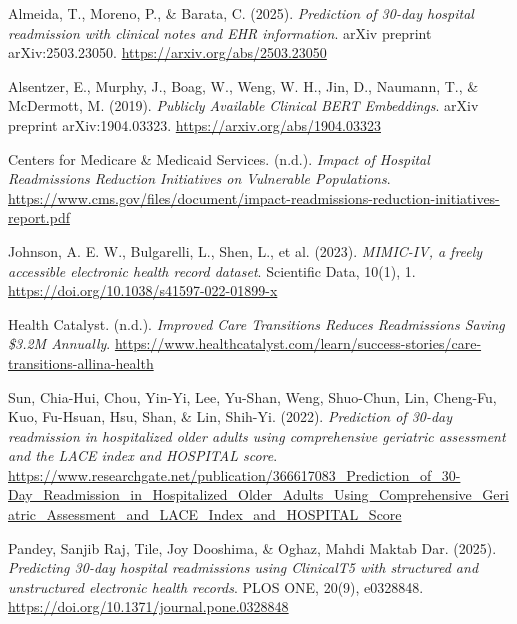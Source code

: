 \documentclass[11pt]{article}
\begin{document}
\vspace{0.6em}
\noindent\hangindent=0.25in
Almeida, T., Moreno, P., \& Barata, C. (2025). \textit{Prediction of 30-day hospital readmission with clinical notes and EHR information}. arXiv preprint arXiv:2503.23050. \url{https://arxiv.org/abs/2503.23050}

\vspace{0.6em}
\noindent\hangindent=0.25in
Alsentzer, E., Murphy, J., Boag, W., Weng, W. H., Jin, D., Naumann, T., \& McDermott, M. (2019). \textit{Publicly Available Clinical BERT Embeddings}. arXiv preprint arXiv:1904.03323. \url{https://arxiv.org/abs/1904.03323}

\vspace{0.6em}
\noindent\hangindent=0.25in
Centers for Medicare \& Medicaid Services. (n.d.). \textit{Impact of Hospital Readmissions Reduction Initiatives on Vulnerable Populations}. \url{https://www.cms.gov/files/document/impact-readmissions-reduction-initiatives-report.pdf}

\vspace{0.6em}
\noindent\hangindent=0.25in
Johnson, A. E. W., Bulgarelli, L., Shen, L., et al. (2023). \textit{MIMIC-IV, a freely accessible electronic health record dataset}. Scientific Data, 10(1), 1. \url{https://doi.org/10.1038/s41597-022-01899-x}

\vspace{0.6em}
\noindent\hangindent=0.25in
Health Catalyst. (n.d.). \textit{Improved Care Transitions Reduces Readmissions Saving \$3.2M Annually}. \url{https://www.healthcatalyst.com/learn/success-stories/care-transitions-allina-health}

\vspace{0.6em}
\noindent\hangindent=0.25in
Sun, Chia-Hui, Chou, Yin-Yi, Lee, Yu-Shan, Weng, Shuo-Chun, Lin, Cheng-Fu, Kuo, Fu-Hsuan, Hsu, Shan, \& Lin, Shih-Yi. (2022).
\textit{Prediction of 30-day readmission in hospitalized older adults using comprehensive geriatric assessment and the LACE index and HOSPITAL score}.
\url{https://www.researchgate.net/publication/366617083_Prediction_of_30-Day_Readmission_in_Hospitalized_Older_Adults_Using_Comprehensive_Geriatric_Assessment_and_LACE_Index_and_HOSPITAL_Score}

\vspace{0.6em}
\noindent\hangindent=0.25in
Pandey, Sanjib Raj, Tile, Joy Dooshima, \& Oghaz, Mahdi Maktab Dar. (2025).
\textit{Predicting 30-day hospital readmissions using ClinicalT5 with structured and unstructured electronic health records}.
PLOS ONE, 20(9), e0328848.
\url{https://doi.org/10.1371/journal.pone.0328848}
\end{document}
